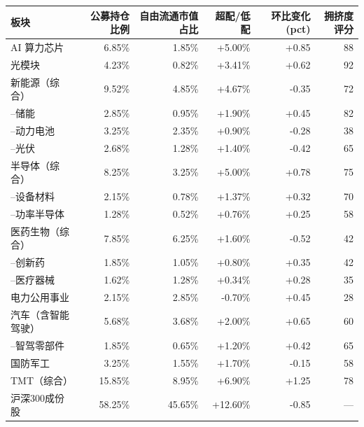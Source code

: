\begin{exhibitbox}[表 C-1：重点板块公募基金持仓分布（2026Q1）]
\centering
\scriptsize
\renewcommand{\arraystretch}{1.15}
\begin{tabular*}{\textwidth}{@{\extracolsep{\fill}}l r r r r r@{}}
\toprule
\textbf{板块} & \textbf{公募持仓比例} & \textbf{自由流通市值占比} & \textbf{超配/低配} & \textbf{环比变化 (pct)} & \textbf{拥挤度评分} \\
\midrule
AI 算力芯片 & 6.85\% & 1.85\% & +5.00\% & +0.85 & 88 \\
光模块 & 4.23\% & 0.82\% & +3.41\% & +0.62 & 92 \\
新能源（综合） & 9.52\% & 4.85\% & +4.67\% & -0.35 & 72 \\
\hspace{2em}--\quad{}储能 & 2.85\% & 0.95\% & +1.90\% & +0.45 & 82 \\
\hspace{2em}--\quad{}动力电池 & 3.25\% & 2.35\% & +0.90\% & -0.28 & 38 \\
\hspace{2em}--\quad{}光伏 & 2.68\% & 1.28\% & +1.40\% & -0.42 & 65 \\
半导体（综合） & 8.25\% & 3.25\% & +5.00\% & +0.78 & 75 \\
\hspace{2em}--\quad{}设备材料 & 2.15\% & 0.78\% & +1.37\% & +0.32 & 70 \\
\hspace{2em}--\quad{}功率半导体 & 1.28\% & 0.52\% & +0.76\% & +0.25 & 58 \\
医药生物（综合） & 7.85\% & 6.25\% & +1.60\% & -0.52 & 42 \\
\hspace{2em}--\quad{}创新药 & 1.85\% & 1.05\% & +0.80\% & +0.35 & 42 \\
\hspace{2em}--\quad{}医疗器械 & 1.62\% & 1.28\% & +0.34\% & +0.28 & 35 \\
电力公用事业 & 2.15\% & 2.85\% & -0.70\% & +0.45 & 28 \\
汽车（含智能驾驶） & 5.68\% & 3.68\% & +2.00\% & +0.65 & 60 \\
\hspace{2em}--\quad{}智驾零部件 & 1.85\% & 0.65\% & +1.20\% & +0.42 & 65 \\
国防军工 & 3.25\% & 1.55\% & +1.70\% & -0.15 & 58 \\
TMT（综合） & 15.85\% & 8.95\% & +6.90\% & +1.25 & 78 \\
\midrule
沪深300成份股 & 58.25\% & 45.65\% & +12.60\% & -0.85 & --- \\
\bottomrule
\end{tabular*}
\vspace{0.5em}
\end{exhibitbox}

